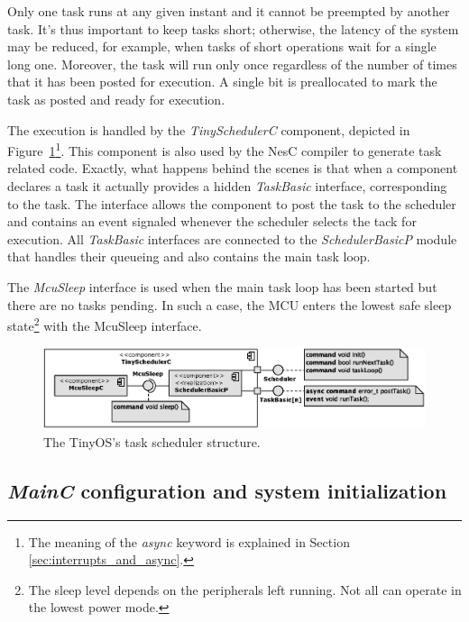 Only one task runs at any given instant and it cannot be preempted by another task. It's thus important to keep tasks short; otherwise, the latency of the system may be reduced, for example, when tasks of short operations wait for a single long one.  Moreover, the task will run only once regardless of the number of times that it has been posted for execution. A single bit is preallocated to mark the task as posted and ready for execution.

The execution is handled by the \emph{TinySchedulerC} component, depicted in Figure~\ref{fig:tinyschedulerc}\footnote{The meaning of the \emph{async} keyword is explained in Section \ref{sec:interrupts_and_async}.}. This component is also used by the NesC compiler to generate task related code. Exactly, what happens behind the scenes is that when a component declares a task it actually provides a hidden \emph{TaskBasic} interface, corresponding to the task. The interface allows the component to post the task to the scheduler and contains an event signaled whenever the scheduler selects the tack for execution.  All \emph{TaskBasic} interfaces are connected to the \emph{SchedulerBasicP} module that handles their queueing and also contains the main task loop.

The \emph{McuSleep} interface is used when the main task loop has been started but there are no tasks pending. In such a case, the MCU enters the lowest safe sleep state\footnote{The sleep level depends on the peripherals left running. Not all can operate in the lowest power mode.} with the McuSleep interface.

\begin{figure}[h]
  \centering
  \includegraphics[width=1.02\textwidth]{diagrams/tinyschedulerc.eps}
  \caption{The TinyOS's task scheduler structure.}
  \label{fig:tinyschedulerc}
\end{figure}

\subsection{\emph{MainC} configuration and system initialization}


